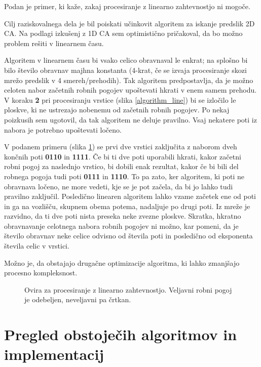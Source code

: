 \documentclass[12pt,a4paper,openany,twoside]{book}
\begin{document}
Podan je primer, ki kaže, zakaj procesiranje z linearno zahtevnostjo ni mogoče.

Cilj raziskovalnega dela je bil poiskati
učinkovit algoritem za iskanje predslik 2D CA. Na podlagi izkušenj z 1D CA
sem optimistično pričakoval, da bo možno problem rešiti v linearnem času.

Algoritem v linearnem času bi vsako celico obravnaval le enkrat;
na splošno bi bilo število obravnav majhna konstanta (4-krat,
če se izvaja procesiranje skozi mrežo predslik v 4 smereh/prehodih).
Tak algoritem predpostavlja, da je možno celoten nabor začetnih
robnih pogojev upoštevati hkrati v enem samem prehodu.
V koraku \textbf{2} pri procesiranju vrstice (slika \ref{algorithm_line})
bi se izločilo le ploskve, ki ne ustrezajo nobenemu od začetnih robnih pogojev.
Po nekaj poizkusih sem ugotovil, da tak algoritem ne deluje pravilno.
Vsaj nekatere poti iz nabora je potrebno upoštevati ločeno.

V podanem primeru (slika \ref{algorithm_issue}) se prvi dve vrstici zaključita z
naborom dveh končnih poti \textbf{0110} in \textbf{1111}. Če bi ti dve poti
uporabili hkrati, kakor začetni robni pogoj za naslednjo vrstico, bi dobili
enak rezultat, kakor če bi bili del robnega pogoja tudi poti \textbf{0111} in \textbf{1110}.
To pa zato, ker algoritem, ki poti ne obravnava ločeno, ne more vedeti,
kje se je pot začela, da bi jo lahko tudi pravilno zaključil.
Posledično linearen algoritem lahko vzame začetek ene od poti in ga
na vozlišču, skupnem obema potema, nadaljuje po drugi poti.
Iz mreže je razvidno, da ti dve poti nista preseka neke zvezne ploskve.
Skratka, hkratno obravnavanje celotnega nabora robnih pogojev ni možno,
kar pomeni, da je število obravnav neke celice odvisno od števila poti
in posledično od eksponenta števila celic v vrstici.

Možno je, da obstajajo drugačne optimizacije algoritma, ki lahko zmanjšajo procesno kompleksnost.

\begin{figure}[htb]
\centerline{}
\caption[Ovira za procesiranje z linearno zahtevnostjo.]
{Ovira za procesiranje z linearno zahtevnostjo.
Veljavni robni pogoj je odebeljen, neveljavni pa črtkan.}
\label{algorithm_issue}
\end{figure}




\chapter{Pregled obstoječih algoritmov in implementacij}
\label{pregled}
\end{document}
